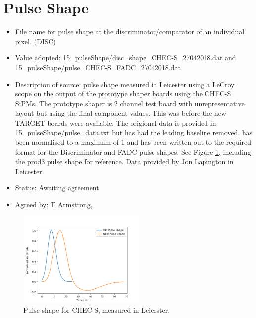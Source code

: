 \documentclass[GCT,short]{gct}
\begin{document}
\section{Pulse Shape}
\begin{itemize}
\item File name for pulse shape at the discriminator/comparator of an individual pixel. (DISC)
\item Value adopted: 15\_pulseShape/disc\_shape\_CHEC-S\_27042018.dat and 15\_pulseShape/pulse\_CHEC-S\_FADC\_27042018.dat
\item Description of source:  pulse shape measured in Leicester using a LeCroy scope on the output of the prototype shaper boards using the CHEC-S SiPMs. The prototype shaper is 2 channel test board with unrepresentative layout but  using the final component values. This was before the new TARGET boards were available. The origional data is provided in 15\_pulseShape/pulse\_data.txt but has had the leading baseline removed, has been normalised to a maximum of 1 and has been written out to the required format for the Discriminator and FADC pulse shapes. See Figure \ref{fig:pulse-shape}, including the prod3 pulse shape for reference. Data provided by Jon Lapington in Leicester.
\item Status: \color{orange}Awaiting agreement\color{black}
\item Agreed by: T Armstrong, 
\end{itemize}

\begin{figure}
\centering
\includegraphics[width=0.55\textwidth]{../15_pulseShape/pulse_shape_comparison.png} 
\caption{Pulse shape for CHEC-S, measured in Leicester.}
\label{fig:pulse-shape}
\end{figure}
\end{document}
